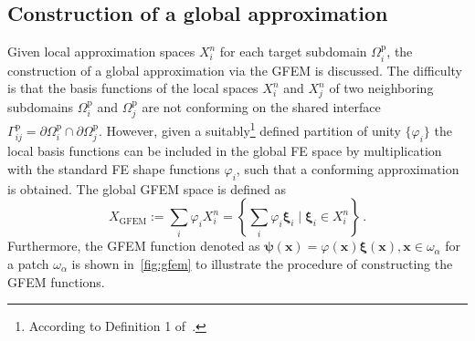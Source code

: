 \documentclass[a4paper]{eccomas_paper-2024}
\newcommand{\p}{\mathrm{p}}
\begin{document}
\subsection{Construction of a global approximation} %
\label{sub:Construction of a global approximation}
Given local approximation spaces $X^n_i$ for each target subdomain $\varOmega_i^{\p}$, the construction of a global approximation via the GFEM is discussed.
The difficulty is that the basis functions of the local spaces $X^n_i$ and $X^n_j$ of two neighboring subdomains $\varOmega_i^{\p}$ and $\varOmega_j^{\p}$ are not conforming on the shared interface $\varGamma^{\p}_{ij}=\partial\varOmega_i^{\p}\cap\partial\varOmega_j^{\p}$.
However, given a suitably\footnote{According to Definition 1 of~\cite{BABUSKA1997}.} defined partition of unity $\{{\varphi}_i\}$ the local basis functions can be included in the global FE space by multiplication with the standard FE shape functions ${\varphi}_i$, such that a conforming approximation is obtained.
The global GFEM space is defined as
\begin{equation}
	\label{eq:Xgfem}
    X_{\mathrm{GFEM}}:= \sum_{i} \varphi_iX^n_i = \left\lbrace\sum_i\varphi_i\bm\xi_i \;\big|\; \bm\xi_i\in X^n_i	\right\rbrace\,.
\end{equation}
Furthermore, the GFEM function denoted as $\bm{\psi}(\bm{x}) = \varphi(\bm{x})\bm{\xi}(\bm{x}), \bm{x}\in\omega_{\alpha}$ for a patch $\omega_{\alpha}$ is shown in~\cref{fig:gfem} to illustrate the procedure of constructing the GFEM functions.
\end{document}
